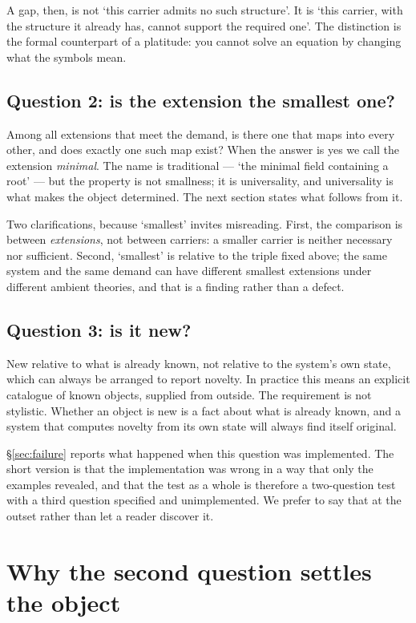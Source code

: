 \documentclass[12pt,a4paper]{article}
\begin{document}
A gap, then, is not `this carrier admits no such structure'.  It is `this carrier,
with the structure it already has, cannot support the required one'.  The
distinction is the formal counterpart of a platitude: you cannot solve an
equation by changing what the symbols mean.

\subsection{Question 2: is the extension the smallest one?}

Among all extensions that meet the demand, is there one that maps into every
other, and does exactly one such map exist?  When the answer is yes we call the
extension \emph{minimal}.  The name is traditional --- `the minimal field
containing a root' --- but the property is not smallness; it is universality, and
universality is what makes the object determined.  The next section states what
follows from it.

Two clarifications, because `smallest' invites misreading.  First, the comparison
is between \emph{extensions}, not between carriers: a smaller carrier is neither
necessary nor sufficient.  Second, `smallest' is relative to the triple fixed
above; the same system and the same demand can have different smallest extensions
under different ambient theories, and that is a finding rather than a defect.

\subsection{Question 3: is it new?}

New relative to what is already known, not relative to the system's own state,
which can always be arranged to report novelty.  In practice this means an
explicit catalogue of known objects, supplied from outside.  The requirement is
not stylistic.  Whether an object is new is a fact about what is already known,
and a system that computes novelty from its own state will always find itself
original.

\S\ref{sec:failure} reports what happened when this question was implemented.  The
short version is that the implementation was wrong in a way that only the
examples revealed, and that the test as a whole is therefore a two-question test
with a third question specified and unimplemented.  We prefer to say that at the
outset rather than let a reader discover it.

\section{Why the second question settles the object}
\label{sec:theorem}
\end{document}
